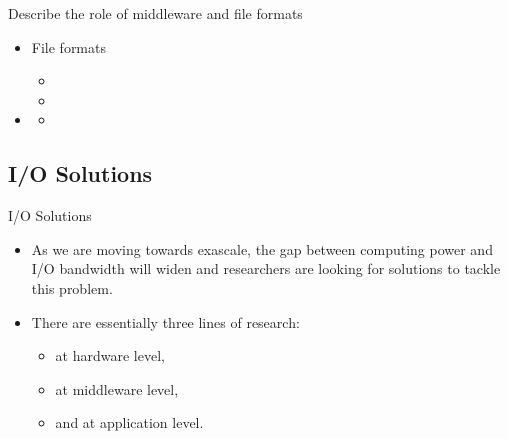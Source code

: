 \documentclass[compress,11pt,xcolor=svgnames,aspectratio=169]{beamer}
\begin{document}
\begin{frame}[t]{Describe the role of middleware and file formats}

\begin{itemize}

  \item File formats
    \begin{itemize}
        \item
        \item
    \end{itemize}

  \item
    \begin{itemize}
      \item
    \end{itemize}

\end{itemize}

\end{frame}

\subsection{I/O Solutions}

\begin{frame}[t]{I/O Solutions}

\begin{itemize}

\item As we are moving towards exascale, the gap between computing power and I/O bandwidth will
widen and researchers are looking for solutions to tackle this problem.\\[0.4cm]

\item There are essentially three lines of research:\\[0.4cm]

    \begin{itemize}
    \setlength\itemsep{0.6cm}

      \item at hardware level,
      \item at middleware level,
      \item and at application level.

    \end{itemize}

\end{itemize}

\end{frame}
\end{document}
